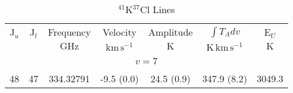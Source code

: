 \begin{table*}[htp]
\centering
\caption{$^{41}$K$^{37}$Cl Lines}
\begin{tabular}{ccccccc}
\label{tab:41K37Cl_salt_lines}
 J$_u$ & J$_l$ & Frequency & Velocity & Amplitude & $\int T_A dv$ & E$_U$ \\
  &  & $\mathrm{GHz}$ & $\mathrm{km\,s^{-1}}$ & $\mathrm{K}$ & $\mathrm{K\,km\,s^{-1}}$ & $\mathrm{K}$ \\
\hline
&\vspace{-0.75em}\\
\multicolumn{7}{c}{$v = 7$} \\
\vspace{-0.75em}\\
 48 & 47 & 334.32791 & -9.5 (0.0) & 24.5 (0.9) & 347.9 (8.2) & 3049.3 \\
\hline
\end{tabular}

\par 
\end{table*}
